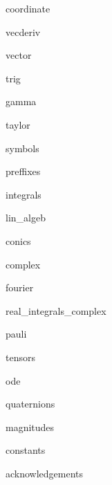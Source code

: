\documentclass[8pt,a4paper,fleqn]{extarticle} %
\begin{document}
\begin{multicols}{3}
\raggedright %
\scriptsize{} 

{coordinate}

{vecderiv}

{vector}

{trig}

{gamma}

{taylor}

{symbols}

{preffixes}

{integrals}

{lin_algeb}

{conics}

{complex}

{fourier}

{real_integrals_complex}

{pauli}

{tensors}

{ode}

{quaternions}

{magnitudes}

{constants}

{acknowledgements}


\end{multicols}
\end{document}

